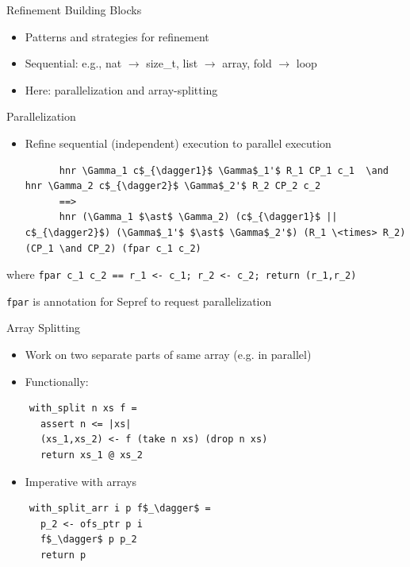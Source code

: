 \documentclass[fleqn]{beamer}
\begin{document}
\begin{frame}{Refinement Building Blocks}
  \begin{itemize}
   \item<+-> Patterns and strategies for refinement
   \item<+-> Sequential: e.g., nat $\to$ size\_t, list $\to$ array, fold $\to$ loop
   \item<+-> Here: parallelization and array-splitting

  \end{itemize}
\end{frame}
\begin{frame}[fragile]{Parallelization}
  \begin{itemize}
   \item Refine sequential (independent) execution to parallel execution
    \small
    \begin{lstlisting}
      hnr \Gamma_1 c$_{\dagger1}$ \Gamma$_1'$ R_1 CP_1 c_1  \and   hnr \Gamma_2 c$_{\dagger2}$ \Gamma$_2'$ R_2 CP_2 c_2
      ==>
      hnr (\Gamma_1 $\ast$ \Gamma_2) (c$_{\dagger1}$ || c$_{\dagger2}$) (\Gamma$_1'$ $\ast$ \Gamma$_2'$) (R_1 \<times> R_2) (CP_1 \and CP_2) (fpar c_1 c_2)
    \end{lstlisting}

  \end{itemize}
  where
    \lstinline{fpar c_1 c_2 == r_1 <- c_1; r_2 <- c_2; return (r_1,r_2)}

    \lstinline{fpar} is annotation for Sepref to request parallelization

\end{frame}
\begin{frame}[fragile]{Array Splitting}
  \begin{itemize}
   \item Work on two separate parts of same array (e.g. in parallel)

   \item Functionally:
  \end{itemize}
  \begin{lstlisting}
    with_split n xs f =
      assert n <= |xs|
      (xs_1,xs_2) <- f (take n xs) (drop n xs)
      return xs_1 @ xs_2
  \end{lstlisting}

  \begin{itemize}
   \item Imperative with arrays
  \end{itemize}
  \begin{lstlisting}
    with_split_arr i p f$_\dagger$ =
      p_2 <- ofs_ptr p i
      f$_\dagger$ p p_2
      return p
  \end{lstlisting}


\end{frame}
\end{document}
